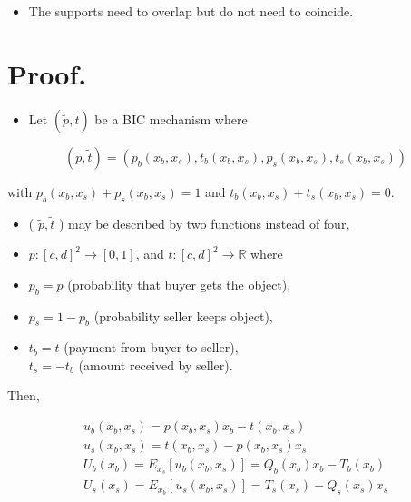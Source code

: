 \documentclass[10pt]{article}
\begin{document}
\begin{itemize}
  \item The supports need to overlap but do not need to coincide.
\end{itemize}

\section*{Proof.}
\begin{itemize}
  \item Let $(\tilde{p}, \tilde{t})$ be a BIC mechanism where
\end{itemize}

$$
(\tilde{p}, \tilde{t})=\left(p_{b}\left(x_{b}, x_{s}\right), t_{b}\left(x_{b}, x_{s}\right), p_{s}\left(x_{b}, x_{s}\right), t_{s}\left(x_{b}, x_{s}\right)\right)
$$

with $p_{b}\left(x_{b}, x_{s}\right)+p_{s}\left(x_{b}, x_{s}\right)=1$ and $t_{b}\left(x_{b}, x_{s}\right)+t_{s}\left(x_{b}, x_{s}\right)=0$.

\begin{itemize}
  \item ( $\tilde{p}, \tilde{t}$ ) may be described by two functions instead of four,
  \item $p:[c, d]^{2} \rightarrow[0,1]$, and $t:[c, d]^{2} \rightarrow \mathbb{R}$ where
  \item $p_{b}=p$ (probability that buyer gets the object),
  \item $p_{s}=1-p_{b}$ (probability seller keeps object),
  \item $t_{b}=t$ (payment from buyer to seller),\\
$t_{s}=-t_{b}$ (amount received by seller).
\end{itemize}

Then,

$$
\begin{gathered}
u_{b}\left(x_{b}, x_{s}\right)=p\left(x_{b}, x_{s}\right) x_{b}-t\left(x_{b}, x_{s}\right) \\
u_{s}\left(x_{b}, x_{s}\right)=t\left(x_{b}, x_{s}\right)-p\left(x_{b}, x_{s}\right) x_{s} \\
U_{b}\left(x_{b}\right)=E_{x_{s}}\left[u_{b}\left(x_{b}, x_{s}\right)\right]=Q_{b}\left(x_{b}\right) x_{b}-T_{b}\left(x_{b}\right) \\
U_{s}\left(x_{s}\right)=E_{x_{b}}\left[u_{s}\left(x_{b}, x_{s}\right)\right]=T_{s}\left(x_{s}\right)-Q_{s}\left(x_{s}\right) x_{s}
\end{gathered}
$$
\end{document}
